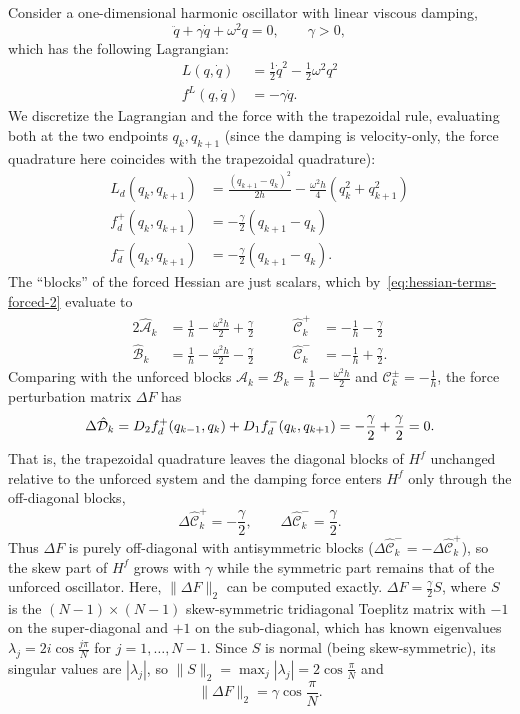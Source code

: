 Consider a one-dimensional harmonic oscillator with linear viscous damping,
\[
	\ddot{q} + \gamma\dot{q} + \omega^2 q = 0, \qquad \gamma > 0,
\]
which has the following Lagrangian:
\begin{align*}
	L(q,\dot{q})   & = \tfrac{1}{2}\dot{q}^2 - \tfrac{1}{2}\omega^2 q^2 \\
	f^L(q,\dot{q}) & = -\gamma\dot{q}.
\end{align*}
We discretize the Lagrangian and the force with the trapezoidal rule, evaluating both at the two endpoints $q_k, q_{k+1}$ (since the damping is velocity-only, the force quadrature here coincides with the trapezoidal quadrature):
\begin{align*}
	L_d(q_k, q_{k+1})   & = \frac{(q_{k+1}-q_k)^2}{2h} - \frac{\omega^2 h}{4}(q_k^2 + q_{k+1}^2) \\
	f_d^+(q_k, q_{k+1}) & = -\frac{\gamma}{2}(q_{k+1}-q_k)                                       \\
	f_d^-(q_k, q_{k+1}) & = -\frac{\gamma}{2}(q_{k+1}-q_k).
\end{align*}
The ``blocks'' of the forced Hessian are just scalars, which by~\eqref{eq:hessian-terms-forced-2} evaluate to
\begin{alignat*}{2}
	\hat{\mathcal{A}}_k   & = \frac{1}{h} - \frac{\omega^2 h}{2} + \frac{\gamma}{2} & \qquad
	\hat{\mathcal{C}}^+_k & = -\frac{1}{h} - \frac{\gamma}{2}                                \\
	\hat{\mathcal{B}}_k   & = \frac{1}{h} - \frac{\omega^2 h}{2} - \frac{\gamma}{2} & \qquad
	\hat{\mathcal{C}}^-_k & = -\frac{1}{h} + \frac{\gamma}{2}.
\end{alignat*}
Comparing with the unforced blocks $\mathcal{A}_k = \mathcal{B}_k = \frac{1}{h} - \frac{\omega^2 h}{2}$ and $\mathcal{C}_k^\pm = -\frac{1}{h}$, the force perturbation matrix $\Delta F$ has
\[
	\Delta\hat{\mathcal{D}}_k = D_{2} f_d^+(q_{k-1}, q_k) + D_{1} f_d^-(q_k, q_{k+1})
	= -\frac{\gamma}{2} + \frac{\gamma}{2} = 0.
\]
That is, the trapezoidal quadrature leaves the diagonal blocks of $H^f$ unchanged relative to the unforced system and the damping force enters $H^f$ only through the off-diagonal blocks,
\[
	\Delta\hat{\mathcal{C}}^+_k = -\frac{\gamma}{2}, \qquad \Delta\hat{\mathcal{C}}^-_k = \frac{\gamma}{2}.
\]
Thus $\Delta F$ is purely off-diagonal with antisymmetric blocks ($\Delta\hat{\mathcal{C}}^-_k = -\Delta\hat{\mathcal{C}}^+_k$), so the skew part of $H^f$ grows with $\gamma$ while the symmetric part remains that of the unforced oscillator. Here, $\|\Delta F\|_2$ can be computed exactly. $\Delta F = \tfrac{\gamma}{2} S$, where $S$ is the $(N-1)\times(N-1)$ skew-symmetric tridiagonal Toeplitz matrix with $-1$ on the super-diagonal and $+1$ on the sub-diagonal, which has known eigenvalues $\lambda_j = 2i\cos\tfrac{j\pi}{N}$ for $j = 1, \dots, N-1$. Since $S$ is normal (being skew-symmetric), its singular values are $|\lambda_j|$, so $\|S\|_2 = \max_j|\lambda_j| = 2\cos\tfrac{\pi}{N}$ and
\[
	\|\Delta F\|_2 = \gamma\cos\frac{\pi}{N}.
\]

